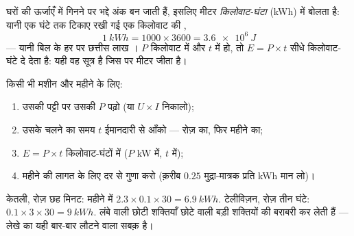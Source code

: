 \begin{definition}[किलोवाट-घंटा]\label{def:g9:electric-power-energy:kwh}
घरों की ऊर्जाएँ  में गिनने पर भद्दे अंक बन जाती हैं, इसलिए मीटर
\emph{किलोवाट-घंटा} (\unit{kWh}) में बोलता है:
यानी एक घंटे तक टिकाए रखी गई एक किलोवाट की ,
\[
\qty{1}{kWh} = 1000 \times 3600 = \qty{3.6e6}{J}
\]
--- यानी बिल के हर  पर छत्तीस लाख । $P$ किलोवाट में और $t$
 में हो, तो $E = P \times t$ सीधे किलोवाट-घंटे दे देता है: यही वह
सूत्र है जिस पर मीटर जीता है।
\end{definition}

\begin{method}[किसी उपकरण का लेखा]\label{met:g9:electric-power-energy:audit}
किसी भी मशीन और महीने के लिए:
\begin{enumerate}
  \item उसकी पट्टी पर उसकी  $P$ पढ़ो (या $U \times I$ निकालो);
  \item उसके चलने का समय $t$ ईमानदारी से आँको --- रोज़ का, फिर महीने
        का;
  \item $E = P \times t$ किलोवाट-घंटों में ($P$ \unit{kW} में, $t$
         में);
  \item महीने की लागत के लिए दर से गुणा करो (क़रीब $0.25$ मुद्रा-मात्रक
        प्रति \unit{kWh} मान लो)।
\end{enumerate}
केतली, रोज़ छह मिनट: महीने में $2.3 \times 0.1 \times 30 =
\qty{6.9}{kWh}$. टेलीविज़न, रोज़ तीन घंटे: $0.1 \times 3 \times 30 =
\qty{9}{kWh}$. लंबे  वाली छोटी शक्तियाँ छोटे  वाली बड़ी
शक्तियों की बराबरी कर लेती हैं --- लेखे का यही बार-बार लौटने वाला
सबक़ है।
\end{method}

